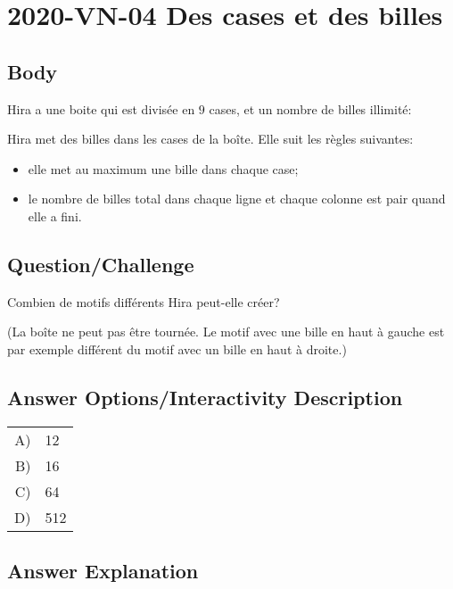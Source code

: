 \documentclass[a4paper,11pt]{report}
\newcommand{\taskGraphicsFolder}{..}
\begin{document}
\section*{\centering{} 2020-VN-04 Des cases et des billes}


\subsection*{Body}

Hira a une boite qui est divisée en $9$ cases, et un nombre de billes illimité:

{\centering%
\par}

Hira met des billes dans les cases de la boîte. Elle suit les règles suivantes:

\begin{itemize}
  \item elle met au maximum une bille dans chaque case;
  \item le nombre de billes total dans chaque ligne et chaque colonne est pair quand elle a fini.
\end{itemize}

{\em

\subsection*{Question/Challenge}

Combien de motifs différents Hira peut-elle créer?

(La boîte ne peut pas être tournée. Le motif avec une bille en haut à gauche est par exemple différent du motif avec un bille en haut à droite.)

}\begingroup
\renewcommand{\arraystretch}{1.5}
\subsection*{Answer Options/Interactivity Description}

\begin{tabular}{ @{} r l @{} }
  A) & 12 \\ 
  B) & 16 \\ 
  C) & 64 \\ 
  D) & 512
\end{tabular}

\endgroup

\subsection*{Answer Explanation}
\end{document}
